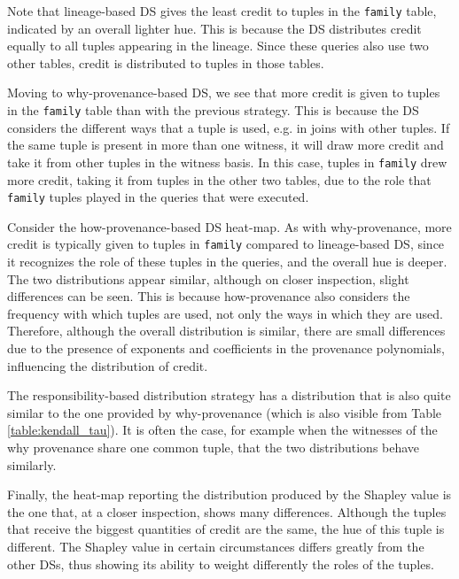 \documentclass[preprint,12pt,sort&compress]{elsarticle}
\newcommand{\rtwo}[1]{\textcolor{reviewer2}{#1}}
\begin{document}
Note that lineage-based DS gives the least credit to tuples in the \texttt{family} table, indicated by an overall lighter hue. This is because the DS  distributes credit equally to all tuples appearing in the lineage. Since these queries also use two other tables, credit is distributed to tuples in those tables.

Moving to why-provenance-based DS, we see that more credit is given to tuples in the \texttt{family} table than with the previous strategy. This is because the DS considers the different ways that a tuple is used, e.g. in joins with other tuples. If the same tuple is present in more than one witness, it will draw more credit and take it from  other tuples in the witness basis. In this case, tuples in \texttt{family} drew more credit, taking it from tuples in the other two tables, due to the role that \texttt{family}  tuples played in the queries that were executed. 

Consider the how-provenance-based DS heat-map. %
As with why-provenance, more credit is typically given to tuples in \texttt{family} compared to lineage-based DS, since it recognizes the role of these tuples in the queries, and the overall hue is deeper.  
The two distributions appear similar, although on closer inspection, slight differences can be seen. 
This is because how-provenance also considers the frequency with which tuples are used, not only the ways in which they are used. Therefore, although the overall distribution is similar, there are small differences due to the presence of exponents and coefficients in the provenance polynomials, influencing the distribution of credit. 

\rtwo{The responsibility-based distribution strategy has a distribution that is also quite similar to the one provided by why-provenance (which is also visible from Table \ref{table:kendall_tau}). It is often the case, for example when the witnesses of the why provenance share one common tuple, that the two distributions behave similarly.} %

\rtwo{Finally, the heat-map reporting the distribution produced by the Shapley value is the one that, at a closer inspection, shows many differences. Although the tuples that receive the biggest quantities of credit are the same, the hue of this tuple is different. The Shapley value in certain circumstances differs greatly from the other DSs, thus showing its ability to weight differently the roles of the tuples.}
\end{document}
